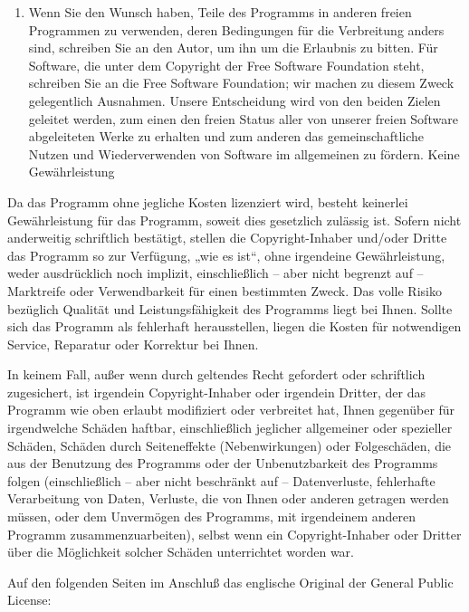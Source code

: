 {\begin{enumerate}
\item Wenn Sie den Wunsch haben, Teile des Programms in anderen freien Programmen zu verwenden, deren Bedingungen für die Verbreitung anders sind, schreiben Sie an den Autor, um ihn um die Erlaubnis zu bitten. Für Software, die unter dem Copyright der Free Software Foundation steht, schreiben Sie an die Free Software Foundation; wir machen zu diesem Zweck gelegentlich Ausnahmen. Unsere Entscheidung wird von den beiden Zielen geleitet werden, zum einen den freien Status aller von unserer freien Software abgeleiteten Werke zu erhalten und zum anderen das gemeinschaftliche Nutzen und Wiederverwenden von Software im allgemeinen zu fördern.
Keine Gewährleistung
\end{enumerate}

{\sc
Da das Programm ohne jegliche Kosten lizenziert wird, besteht keinerlei Gewährleistung für das Programm, soweit dies gesetzlich zulässig ist. Sofern nicht anderweitig schriftlich bestätigt, stellen die Copyright-Inhaber und/oder Dritte das Programm so zur Verfügung, „wie es ist“, ohne irgendeine Gewährleistung, weder ausdrücklich noch implizit, einschließlich – aber nicht begrenzt auf – Marktreife oder Verwendbarkeit für einen bestimmten Zweck. Das volle Risiko bezüglich Qualität und Leistungsfähigkeit des Programms liegt bei Ihnen. Sollte sich das Programm als fehlerhaft herausstellen, liegen die Kosten für notwendigen Service, Reparatur oder Korrektur bei Ihnen.

In keinem Fall, außer wenn durch geltendes Recht gefordert oder schriftlich zugesichert, ist irgendein Copyright-Inhaber oder irgendein Dritter, der das Programm wie oben erlaubt modifiziert oder verbreitet hat, Ihnen gegenüber für irgendwelche Schäden haftbar, einschließlich jeglicher allgemeiner oder spezieller Schäden, Schäden durch Seiteneffekte (Nebenwirkungen) oder Folgeschäden, die aus der Benutzung des Programms oder der Unbenutzbarkeit des Programms folgen (einschließlich – aber nicht beschränkt auf – Datenverluste, fehlerhafte Verarbeitung von Daten, Verluste, die von Ihnen oder anderen getragen werden müssen, oder dem Unvermögen des Programms, mit irgendeinem anderen Programm zusammenzuarbeiten), selbst wenn ein Copyright-Inhaber oder Dritter über die Möglichkeit solcher Schäden unterrichtet worden war. 
}
}


\vspace{1cm}
Auf den folgenden Seiten im Anschluß das englische Original der General Public License: 
\newpage 

